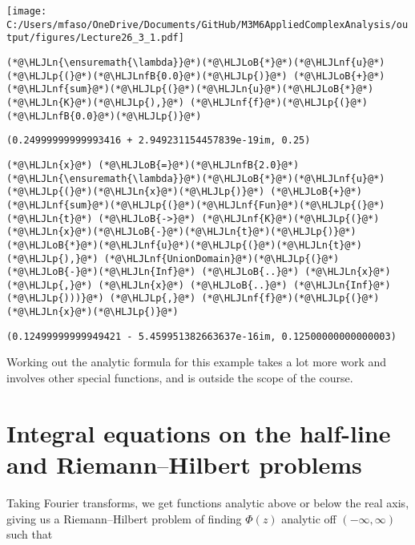 \documentclass[12pt,landscape]{article}
\newcommand{\HLJLn}[1]{#1}
\newcommand{\HLJLnf}[1]{\textcolor[RGB]{66,102,213}{#1}}
\newcommand{\HLJLnfB}[1]{\textcolor[RGB]{59,151,46}{#1}}
\newcommand{\HLJLoB}[1]{\textcolor[RGB]{102,102,102}{\textbf{#1}}}
\newcommand{\HLJLp}[1]{#1}
\def\endash{–}
\begin{document}
{\texttt{[image: C:/Users/mfaso/OneDrive/Documents/GitHub/M3M6AppliedComplexAnalysis/output/figures/Lecture26\_3\_1.pdf]}

\begin{lstlisting}
(*@\HLJLn{\ensuremath{\lambda}}@*)(*@\HLJLoB{*}@*)(*@\HLJLnf{u}@*)(*@\HLJLp{(}@*)(*@\HLJLnfB{0.0}@*)(*@\HLJLp{)}@*) (*@\HLJLoB{+}@*)  (*@\HLJLnf{sum}@*)(*@\HLJLp{(}@*)(*@\HLJLn{u}@*)(*@\HLJLoB{*}@*)(*@\HLJLn{K}@*)(*@\HLJLp{),}@*) (*@\HLJLnf{f}@*)(*@\HLJLp{(}@*)(*@\HLJLnfB{0.0}@*)(*@\HLJLp{)}@*)
\end{lstlisting}

\begin{lstlisting}
(0.24999999999993416 + 2.949231154457839e-19im, 0.25)
\end{lstlisting}


\begin{lstlisting}
(*@\HLJLn{x}@*) (*@\HLJLoB{=}@*)(*@\HLJLnfB{2.0}@*)
(*@\HLJLn{\ensuremath{\lambda}}@*)(*@\HLJLoB{*}@*)(*@\HLJLnf{u}@*)(*@\HLJLp{(}@*)(*@\HLJLn{x}@*)(*@\HLJLp{)}@*) (*@\HLJLoB{+}@*)  (*@\HLJLnf{sum}@*)(*@\HLJLp{(}@*)(*@\HLJLnf{Fun}@*)(*@\HLJLp{(}@*)(*@\HLJLn{t}@*) (*@\HLJLoB{->}@*) (*@\HLJLnf{K}@*)(*@\HLJLp{(}@*)(*@\HLJLn{x}@*)(*@\HLJLoB{-}@*)(*@\HLJLn{t}@*)(*@\HLJLp{)}@*)(*@\HLJLoB{*}@*)(*@\HLJLnf{u}@*)(*@\HLJLp{(}@*)(*@\HLJLn{t}@*)(*@\HLJLp{),}@*) (*@\HLJLnf{UnionDomain}@*)(*@\HLJLp{(}@*)(*@\HLJLoB{-}@*)(*@\HLJLn{Inf}@*) (*@\HLJLoB{..}@*) (*@\HLJLn{x}@*)(*@\HLJLp{,}@*) (*@\HLJLn{x}@*) (*@\HLJLoB{..}@*) (*@\HLJLn{Inf}@*)(*@\HLJLp{)))}@*) (*@\HLJLp{,}@*) (*@\HLJLnf{f}@*)(*@\HLJLp{(}@*)(*@\HLJLn{x}@*)(*@\HLJLp{)}@*)
\end{lstlisting}

\begin{lstlisting}
(0.12499999999949421 - 5.459951382663637e-16im, 0.12500000000000003)
\end{lstlisting}


Working out the analytic formula for this example takes a lot more work and involves other special functions, and is outside the scope of the course.

\section{Integral equations on the half-line and Riemann\ensuremath{\endash}Hilbert problems}
Taking Fourier transforms, we get functions analytic above or below the real axis, giving us a Riemann\ensuremath{\endash}Hilbert problem of finding $\Phi(z)$ analytic off $(-\infty,\infty)$ such that

}
\end{document}
